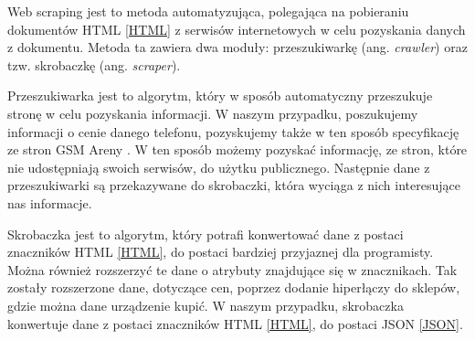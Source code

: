 Web scraping \cite{web_scraping} jest to metoda automatyzująca, polegająca na pobieraniu dokumentów HTML \ref{HTML} z serwisów internetowych w celu pozyskania danych z dokumentu. Metoda ta zawiera dwa moduły: przeszukiwarkę (ang. \textit{crawler}) oraz tzw. skrobaczkę (ang. \textit{scraper}).

Przeszukiwarka jest to algorytm, który w sposób automatyczny przeszukuje stronę w celu pozyskania informacji. W naszym przypadku, poszukujemy informacji o cenie danego telefonu, pozyskujemy także w ten sposób specyfikację ze stron GSM Areny \cite{gsm_arena}. W ten sposób możemy pozyskać informację, ze stron, które nie udostępniają swoich serwisów, do użytku publicznego. Następnie dane z przeszukiwarki są przekazywane do skrobaczki, która wyciąga z nich interesujące nas informacje.

Skrobaczka jest to algorytm, który potrafi konwertować dane z postaci znaczników HTML \ref{HTML}, do postaci bardziej przyjaznej dla programisty. Można również rozszerzyć te dane o atrybuty znajdujące się w znacznikach. Tak zostały rozszerzone dane, dotyczące cen, poprzez dodanie hiperłączy do sklepów, gdzie można dane urządzenie kupić. W naszym przypadku, skrobaczka konwertuje dane z postaci znaczników HTML \ref{HTML}, do postaci JSON \ref{JSON}.

